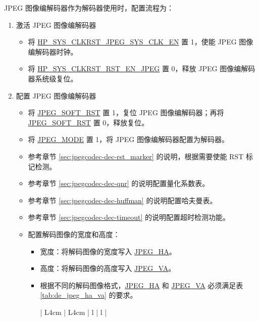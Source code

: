 \documentclass[main\_\_CN.tex]{subfiles}
\begin{document}
JPEG 图像编解码器作为解码器使用时，配置流程为：
\begin{enumerate}
    \item 激活 JPEG 图像编解码器
    \begin{itemize}
        \item 将 \hyperref[fielddesc:HPSYSCLKRSTJPEGSYSCLKEN]{HP\_SYS\_CLKRST\_JPEG\_SYS\_CLK\_EN} 置 1，使能 JPEG 图像编解码器时钟。
        \item 将 \hyperref[fielddesc:HPSYSCLKRSTRSTENJPEG]{HP\_SYS\_CLKRST\_RST\_EN\_JPEG} 置 0，释放 JPEG 图像编解码器系统级复位。
    \end{itemize}
    \item 配置 JPEG 图像编解码器
    \begin{itemize}
        \item 将 \hyperref[fielddesc:JPEGSOFTRST]{JPEG\_SOFT\_RST} 置 1，复位 JPEG 图像编解码器；再将 \hyperref[fielddesc:JPEGSOFTRST]{JPEG\_SOFT\_RST} 置 0，释放复位。
        \item 将 \hyperref[fielddesc:JPEGMODE]{JPEG\_MODE} 置 1，将 JPEG 图像编解码器配置为解码器。
        \item 参考章节 \ref{sec:jpegcodec-dec-rst_marker} \textit{} 的说明，根据需要使能 RST 标记检测。
        \item 参考章节 \ref{sec:jpegcodec-dec-qnr} \textit{} 的说明配置量化系数表。
        \item 参考章节 \ref{sec:jpegcodec-dec-huffman} \textit{} 的说明配置哈夫曼表。
        \item 参考章节 \ref{sec:jpegcodec-dec-timeout} \textit{} 的说明配置超时检测功能。
        \item 配置解码图像的宽度和高度：
        \begin{itemize}
            \item 宽度：将解码图像的宽度写入 \hyperref[fielddesc:JPEGHA]{JPEG\_HA}。
            \item 高度：将解码图像的高度写入 \hyperref[fielddesc:JPEGVA]{JPEG\_VA}。
            \item 根据不同的解码图像格式，\hyperref[fielddesc:JPEGHA]{JPEG\_HA} 和 \hyperref[fielddesc:JPEGVA]{JPEG\_VA} 必须满足表 \ref{tab:de_jpeg_ha_va} \textit{} 的要求。
            \begin{longtable}{ | L{4cm} | L{4cm} | l | l |}
                \caption{JPEG 解码器 \hyperref[fielddesc:JPEGHA]{JPEG\_HA}、\hyperref[fielddesc:JPEGVA]{JPEG\_VA} 的配置} \label{tab:de_jpeg_ha_va}

\end{longtable}
\end{itemize}
\end{itemize}
\end{enumerate}
\end{document}
